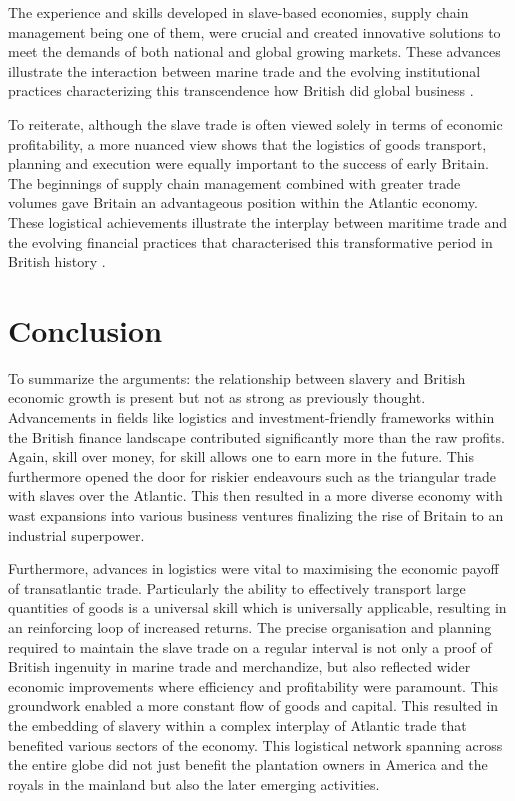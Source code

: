 \documentclass[a4paper,11pt]{article}
\begin{document}
The experience and skills developed in slave-based economies, supply chain management being one of them, were crucial and created innovative solutions to meet the demands of both national and global growing markets. These advances illustrate the interaction between marine trade and the evolving institutional practices characterizing this transcendence how British did global business \citep{berghudson2021}.

To reiterate, although the slave trade is often viewed solely in terms of economic profitability, a more nuanced view shows that the logistics of goods transport, planning and execution were equally important to the success of early Britain. The beginnings of supply chain management combined with greater trade volumes gave Britain an advantageous position within the Atlantic economy. These logistical achievements illustrate the interplay between maritime trade and the evolving financial practices that characterised this transformative period in British history \citep{harley2015}.

\section{Conclusion}

To summarize the arguments: the relationship between slavery and British economic growth is present but not as strong as previously thought. Advancements in fields like logistics and investment-friendly frameworks within the British finance landscape contributed significantly more than the raw profits. Again, skill over money, for skill allows one to earn more in the future. This furthermore opened the door for riskier endeavours such as the triangular trade with slaves over the Atlantic. This then resulted in a more diverse economy with wast expansions into various business ventures finalizing the rise of Britain to an industrial superpower.

Furthermore, advances in logistics were vital to maximising the economic payoff of transatlantic trade. Particularly the ability to effectively transport large quantities of goods is a universal skill which is universally applicable, resulting in an reinforcing loop of increased returns. The precise organisation and planning required to maintain the slave trade on a regular interval is not only a proof of British ingenuity in marine trade and merchandize, but also reflected wider economic improvements where efficiency and profitability were paramount. This groundwork enabled a more constant flow of goods and capital. This resulted in the embedding of slavery within a complex interplay of Atlantic trade that benefited various sectors of the economy. This logistical network   spanning across the entire globe did not just benefit the plantation owners in America and the royals in the mainland but also the later emerging activities.
\end{document}
